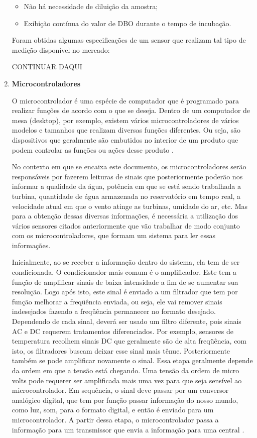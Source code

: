 \begin{enumerate}
	\begin{itemize}
	 \item Não há necessidade de diluição da amostra;
	 \item Exibição contínua do valor de DBO durante o tempo de incubação.
	\end{itemize}
	
	Foram obtidas algumas especificações de um sensor que realizam tal tipo de medição disponível no mercado:
	
	CONTINUAR DAQUI
    
    \item \textbf{Microcontroladores}
	
	O microcontrolador é uma espécie de computador que é programado para realizar funções de acordo com o que se deseja.
	Dentro de um computador de mesa (desktop), por exemplo, existem vários microcontroladores de vários modelos e tamanhos
	que realizam diversas funções diferentes. Ou seja, são dispositivos que geralmente são embutidos no interior de um produto
	que podem controlar as funções ou ações desse produto \footnotemark. 
	
	No contexto em que se encaixa este documento, os microcontroladores serão responsáveis por fazerem leituras de sinais 
	que posteriormente poderão nos informar a qualidade da água, potência em que se está sendo trabalhada a turbina,
	quantidade de água armazenada no reservatório em tempo real, a velocidade atual em que o vento atinge as turbinas,
	umidade do ar, etc. Mas para a obtenção dessas diversas informações, é necessária a utilização dos vários sensores
	citados anteriormente que vão trabalhar de modo conjunto com os microcontroladores, que formam um sistema para ler
	essas informações.
	
	Inicialmente, ao se receber a informação dentro do sistema, ela tem de ser condicionada. O condicionador mais comum é
	o amplificador. Este tem a função de amplificar sinais de baixa intensidade a fim de se aumentar sua resolução. Logo
	após isto, este sinal é enviado a um filtrador que tem por função melhorar a freqüência enviada, ou seja, ele vai
	remover sinais indesejados fazendo a freqüência permanecer no formato desejado. Dependendo de cada sinal, deverá ser
	usado um filtro diferente, pois sinais AC e DC requerem tratamentos diferenciados. Por exemplo, sensores de temperatura 
	recolhem sinais DC que geralmente são de alta freqüência, com isto, os filtradores buscam deixar esse sinal mais tênue.
	Posteriormente também se pode amplificar novamente o sinal. Essa etapa geralmente depende da ordem em que a tensão está
	chegando. Uma tensão da ordem de micro volts pode requerer ser amplificada mais uma vez para que seja sensível ao
	microcontrolador. Em sequência, o sinal deve passar por um conversor analógico digital, que tem por função passar
	informação do nosso mundo, como luz, som, para o formato digital, e então é enviado para um microcontrolador. A partir
	dessa etapa, o microcontrolador passa a informação para um transmissor que envia a informação para uma central \footnotemark.
	

\end{enumerate}
